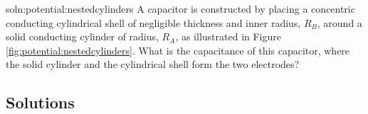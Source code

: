 \begin{problem}{soln:potential:nestedcylinders}{\label{prob:potential:nestedcylinders} A capacitor is constructed by placing a concentric conducting cylindrical shell of negligible thickness and inner radius, $R_B$, around a solid conducting cylinder of radius, $R_A$, as illustrated in Figure \ref{fig:potential:nestedcylinders}. What is the capacitance of this capacitor, where the solid cylinder and the cylindrical shell form the two electrodes?
}
\end{problem}

\newpage
\subsection{Solutions}
